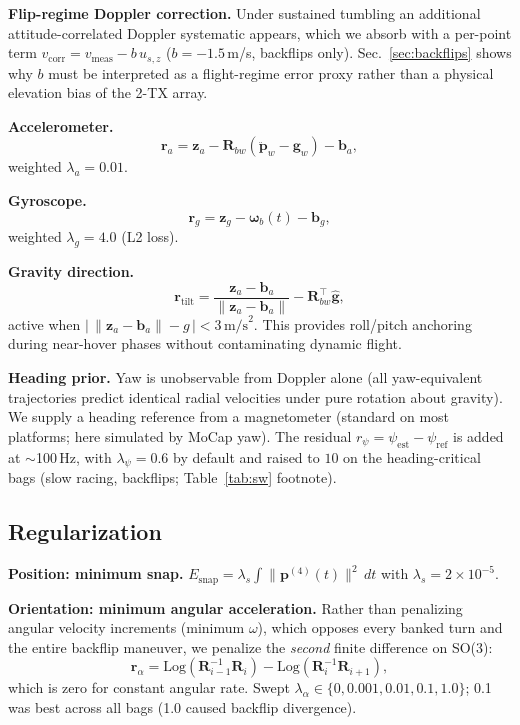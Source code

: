 \documentclass[conference]{IEEEtran}
\newcommand{\vR}{\mathbf{R}}
\newcommand{\vp}{\mathbf{p}}
\newcommand{\vom}{\boldsymbol{\omega}}
\newcommand{\vg}{\mathbf{g}}
\newcommand{\vb}{\mathbf{b}}
\newcommand{\vz}{\mathbf{z}}
\newcommand{\Log}{\mathrm{Log}}
\begin{document}
\textbf{Flip-regime Doppler correction.}
Under sustained tumbling an additional attitude-correlated Doppler
systematic appears, which we absorb with a per-point term
$v_{\mathrm{corr}} = v_{\mathrm{meas}} - b\,u_{s,z}$ ($b{=}{-}1.5$\,m/s,
backflips only).  Sec.~\ref{sec:backflips} shows why $b$ must be
interpreted as a flight-regime error proxy rather than a physical
elevation bias of the 2-TX array.

\textbf{Accelerometer.}
\begin{equation}
  \mathbf{r}_a = \vz_a - \vR_{bw}\!\left(\ddot{\vp}_w - \vg_w\right) - \vb_a,
  \label{eq:accel}
\end{equation}
weighted $\lambda_a = 0.01$.

\textbf{Gyroscope.}
\begin{equation}
  \mathbf{r}_g = \vz_g - \vom_b(t) - \vb_g,
  \label{eq:gyro}
\end{equation}
weighted $\lambda_g = 4.0$ (L2 loss).

\textbf{Gravity direction.}
\begin{equation}
  \mathbf{r}_{\mathrm{tilt}} =
    \frac{\vz_a - \vb_a}{\|\vz_a - \vb_a\|} - \vR_{bw}^{\top}\hat{\vg},
  \label{eq:tilt}
\end{equation}
active when $\bigl|\,\|\vz_a{-}\vb_a\| - g\,\bigr| < 3\,\mathrm{m/s}^2$.
This provides roll/pitch anchoring during near-hover phases without
contaminating dynamic flight.

\textbf{Heading prior.}
Yaw is unobservable from Doppler alone (all yaw-equivalent
trajectories predict identical radial velocities under pure
rotation about gravity).  We supply a heading reference from a magnetometer (standard on
most platforms; here simulated by MoCap yaw).  The residual $r_\psi = \psi_\text{est} - \psi_\text{ref}$
is added at $\sim$100\,Hz, with $\lambda_\psi = 0.6$ by default and
raised to $10$ on the heading-critical bags (slow racing, backflips;
Table~\ref{tab:sw} footnote).

\subsection{Regularization}
\label{sec:reg}

\textbf{Position: minimum snap.}
$E_{\text{snap}} = \lambda_s \int \|\vp^{(4)}(t)\|^2\,dt$
with $\lambda_s = 2{\times}10^{-5}$.

\textbf{Orientation: minimum angular acceleration.}
Rather than penalizing angular velocity increments (minimum $\omega$),
which opposes every banked turn and the entire backflip maneuver, we
penalize the \emph{second} finite difference on SO(3):
\begin{equation}
  \mathbf{r}_\alpha = \Log(\vR_{i-1}^{-1}\vR_i)
                    - \Log(\vR_i^{-1}\vR_{i+1}),
  \label{eq:min_alpha}
\end{equation}
which is zero for constant angular rate.
Swept $\lambda_\alpha \in \{0, 0.001, 0.01, 0.1, 1.0\}$; 0.1
was best across all bags (1.0 caused backflip divergence).
\end{document}
